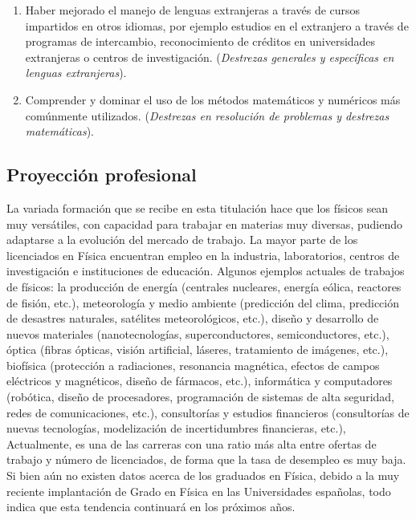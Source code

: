\begin{enumerate}
\item Haber mejorado el manejo de lenguas extranjeras a través de cursos impartidos en otros idiomas, por ejemplo estudios en el extranjero a través de programas de intercambio, reconocimiento de créditos en universidades extranjeras o centros de investigación. (\emph{Destrezas generales y específicas
en lenguas extranjeras}).

\item Comprender y dominar el uso de los métodos matemáticos y numéricos más comúnmente utilizados. (\emph{Destrezas en resolución de problemas y destrezas matemáticas}).

\end{enumerate}

\subsection{Proyección profesional}

La variada formación que se recibe en esta titulación hace que los físicos sean muy versátiles, con capacidad para trabajar en materias muy diversas, pudiendo adaptarse a la evolución del mercado de trabajo. La mayor parte de los licenciados en Física encuentran empleo en la industria, laboratorios, centros de investigación e instituciones de educación. Algunos ejemplos actuales de trabajos de físicos: la producción de energía (centrales nucleares, energía eólica, reactores de fisión, etc.), meteorología y medio ambiente (predicción del clima, predicción de desastres naturales, satélites meteorológicos, etc.), diseño y desarrollo de nuevos materiales (nanotecnologías, superconductores, semiconductores, etc.), óptica (fibras ópticas, visión artificial, láseres, tratamiento de imágenes, etc.), biofísica (protección a radiaciones, resonancia magnética, efectos de campos eléctricos y magnéticos, diseño de fármacos, etc.), informática y computadores (robótica, diseño de procesadores, programación de sistemas de alta seguridad, redes de comunicaciones, etc.), consultorías y estudios financieros (consultorías de nuevas tecnologías, modelización de incertidumbres financieras, etc.), Actualmente, es una de las carreras con una ratio más alta entre ofertas de trabajo y número de licenciados, de forma que la tasa de desempleo es muy baja. Si bien aún no existen datos acerca de los graduados en Física, debido a la muy reciente implantación de Grado en Física en las Universidades españolas, todo indica que esta tendencia continuará en los próximos años. 

